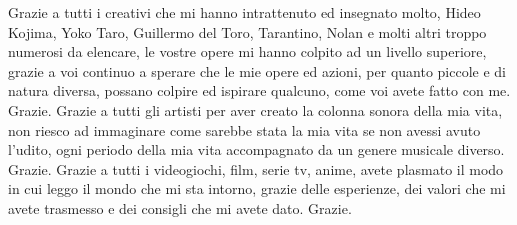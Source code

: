 \documentclass[a4paper,12pt,oneside]{book}
\begin{document}
Grazie a tutti i creativi che mi hanno intrattenuto ed insegnato molto, Hideo Kojima, Yoko Taro, Guillermo del Toro, Tarantino, Nolan e molti altri troppo numerosi da elencare, le vostre opere mi hanno colpito ad un livello superiore, grazie a voi continuo a sperare che le mie opere ed azioni, per quanto piccole e di natura diversa, possano colpire ed ispirare qualcuno, come voi avete fatto con me. Grazie.
Grazie a tutti gli artisti per aver creato la colonna sonora della mia vita, non riesco ad immaginare come sarebbe stata la mia vita se non avessi avuto l'udito, ogni periodo della mia vita accompagnato da un genere musicale diverso. Grazie. 
Grazie a tutti i videogiochi, film, serie tv, anime, avete plasmato il modo in cui leggo il mondo che mi sta intorno, grazie delle esperienze, dei valori che mi avete trasmesso e dei consigli che mi avete dato. Grazie. 




\nocite{*}


\end{document}
